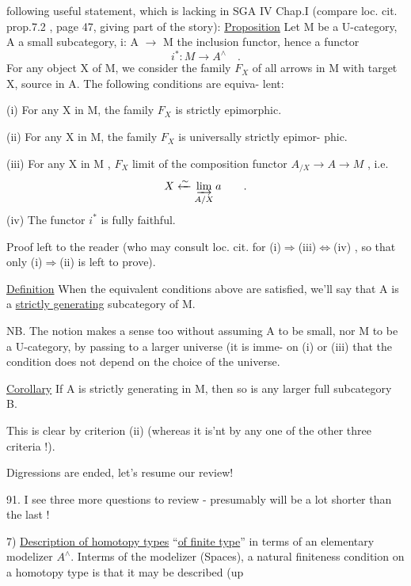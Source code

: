 
following useful statement,  which is lacking in SGA IV Chap.I
(compare loc. cit.  prop.7.2 , page 47,  giving part of the story):
\uline{Proposition}  Let M be a U-category,  A a small  subcategory,  i: A $\to$ M
the inclusion functor,  hence a functor
\[ i^{*} : M \longrightarrow A^{\wedge} \quad . \]
For any object X of M,  we consider the family \xout{\unsure{$\Phi$}} $F_X$  of all arrows
in M with target X,  source in A.  The following conditions are equiva-%
lent:

(i)  For any X in M,  the family $F_X$ is strictly epimorphic.

(ii) For any X in M,  the family $F_X$ is universally strictly epimor-%
phic.

(iii)  For any X in M ,  $F_X$   limit of the
composition functor  $A_{/X} \to A \to M$ ,  i.e.
\[ X \xleftarrow{\sim} \varinjlim_{A/X} a \qquad . \]
(iv)  The functor $i^{*}$ is fully faithful.

Proof left to the reader (who may consult loc. cit. for 
(i)$\Longrightarrow$(iii)$\Longleftrightarrow$(iv) ,  so that only (i)$\Rightarrow$(ii) is left to prove).

\uline{Definition}  When the equivalent conditions above are satisfied, we'll
say that A is a \uline{strictly generating} subcategory of M.

NB. The notion makes a sense too without assuming  A to be small,
nor M to be a U-category,  by passing to a larger universe  (it is imme-%
on (i) or (iii)  that the condition does not depend on the choice of the
universe\hand{)}.

\uline{Corollary}  If A is strictly generating in M,  then so is any larger
full subcategory B.

This is clear by criterion (ii)  (whereas it is'nt by any one of
\margin{$\uparrow$}the other three criteria !).

\margin{$\llcorner$}Digressions are ended,  let's resume our review!

\margin{$\downarrow$}91.   I see three more questions to review -  presumably  will be
a lot shorter than the last !

7)  \uline{Description of homotopy types} ``\uline{of finite type}''\hand{,} in terms of an
elementary modelizer $A^{\wedge}$.  In\hand{|}terms of the modelizer (Spaces), a natural
finiteness condition on a homotopy type is that it may be described (up


